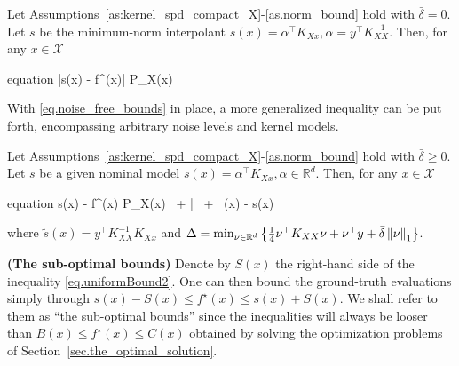 \begin{proposition}
	Let Assumptions~\ref{as:kernel_spd_compact_X}-\ref{as.norm_bound} hold with $\bar \delta = 0$. Let $s$ be the minimum-norm interpolant $s(x)=\alpha^\top K_{Xx}, \alpha = y^\top K_{XX}^{-1}$. Then, for any $x \in \mathcal{X}$
	\label{prop.noise_free_bound}
	\begin{empheq}[box={\mymathbox[colback=black!2,drop small lifted shadow, sharp corners]}]{equation}
		\label{eq.noise_free_bounds}
		\left|s(x) - f^\star(x)\right| \leq P_X(x) 
	\end{empheq}
\end{proposition}

With \eqref{eq.noise_free_bounds} in place, a more generalized inequality can be put forth, encompassing arbitrary noise levels and kernel models.

\begin{proposition}
	\label{prop:closed_form_bounds}
	Let Assumptions~\ref{as:kernel_spd_compact_X}-\ref{as.norm_bound} hold with $\bar\delta \geq 0$. Let $s$ be a given nominal model $s(x)=\alpha^\top K_{Xx}, \alpha \in \mathbb{R}^d$. Then, for any $x \in \mathcal{X}$
	\begin{empheq}[box={\mymathbox[colback=black!2,drop small lifted shadow, sharp corners]}]{equation}
		\vert s(x) - f^\star(x) \vert \leq  P_X(x) \,  + \bar{\delta} \,  + \, \vert {}(x) - s(x) \vert
		\label{eq.uniformBound2}
	\end{empheq}
	where $\tilde{s}(x) = y^\top K_{XX}^{-1} K_{Xx}$ and $\Delta = \min_{\nu \in \mathbb{R}^d} \left\{ \frac{1}{4}\nu^\top K_{XX}\nu + \nu^\top y + \bar{\delta} \left\| \nu \right\|_1\right\}$.
\end{proposition}

\begin{remark}
	\textbf{(The sub-optimal bounds)}
	Denote by $S(x)$ the right-hand side of the inequality \eqref{eq.uniformBound2}. One can then bound the ground-truth evaluations simply through $s(x) - S(x) \leq f^\star(x) \leq s(x) + S(x)$. We shall refer to them as ``the sub-optimal bounds'' since the inequalities will always be looser than $B(x) \leq f^\star(x) \leq C(x)$ obtained by solving the optimization problems of Section~\ref{sec.the_optimal_solution}.
\end{remark}

